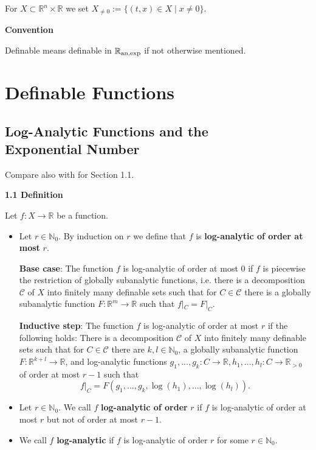 \documentclass[12pt]{article}
\def\vs{\vspace}
\begin{document}
\vs{0.2cm}
For $X \subset \mathbb{R}^n \times \mathbb{R}$ we set $X_{\neq 0}:=\{(t,x) \in X \mid x \neq 0\}$.

\vs{0.4cm}
{\bf Convention}

\vs{0.1cm}
Definable means definable in $\mathbb{R}_{\textnormal{an,exp}}$ if not otherwise mentioned.
 
\section{Definable Functions}

\subsection{Log-Analytic Functions and the \\ Exponential Number}

Compare also with \cite{10} for Section 1.1. 

\vs{0.3cm}
{\bf1.1 Definition} 

\vs{0.1cm}
Let $f:X \to \mathbb{R}$ be a function.
\begin{itemize}
	\item [(a)] Let $r \in \mathbb{N}_0$. By induction on $r$ we define that $f$ is \textbf{log-analytic of order at most} $r$.
	
	\vs{0.3cm}
	\textbf{Base case}: The function $f$ is log-analytic of order at most $0$ if $f$ is piecewise the restriction of  globally subanalytic functions, i.e. there is a decomposition $\mathcal{C}$ of $X$ into finitely many definable sets such that for $C \in \mathcal{C}$ there is a globally subanalytic function $F:\mathbb{R}^m \to \mathbb{R}$ such that $f|_C = F|_C$.
	
	\vs{0.3cm}
	\textbf{Inductive step}: The function $f$ is log-analytic of order at most $r$ if the following holds: There is a decomposition $\mathcal{C}$ of $X$ into finitely many definable sets such that for $C \in \mathcal{C}$ there are $k,l \in \mathbb{N}_{0}$, a globally subanalytic function $F:\mathbb{R}^{k+l} \to \mathbb{R}$, and log-analytic functions $g_1,...,g_k:C \to \mathbb{R}, h_1,...,h_l:C \to \mathbb{R}_{>0}$ of order at most $r-1$ such that
	$$f|_C=F(g_1,...,g_k,\log(h_1),...,\log(h_l)).$$
	
	\item[(b)] Let $r \in \mathbb{N}_0$. We call $f$ \textbf{log-analytic of order} $r$ if $f$ is log-analytic of order at most $r$ but not of order at most $r-1$.
	
	\item[(c)] We call $f$ \textbf{log-analytic} if $f$ is log-analytic of order $r$ for some $r \in \mathbb{N}_0$.
\end{itemize}
\end{document}
